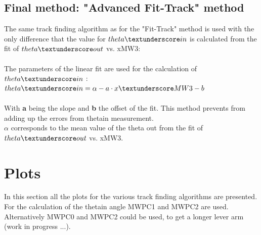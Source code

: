 \documentclass[12pt, letterpaper]{article}
\begin{document}
\subsection{Final method: "Advanced Fit-Track" method}
The same track finding algorithm as for the "Fit-Track" method is used with the only difference that the value for $theta\textunderscore in$ is calculated from the fit of $theta\textunderscore out$ vs. xMW3:\\
\\
The parameters of the linear fit are used for the calculation of $theta\textunderscore in$ :\\

$theta\textunderscore in = \alpha - a \cdot x\textunderscore MW3 - b$ \\
\\
With \textbf{a} being the slope and \textbf{b} the offset of the fit. This method prevents from adding up the errors from theta\textunderscore in measurement.\\
$\alpha$ corresponds to the mean value of the theta \textunderscore out from the fit of $theta\textunderscore out$ vs. xMW3.

\section{Plots}
In this section all the plots for the various track finding algorithms are presented. For the calculation of the theta\textunderscore in angle MWPC1 and MWPC2 are used. Alternatively MWPC0 and MWPC2 could be used, to get a longer lever arm (work in progress ...).\\
\end{document}
